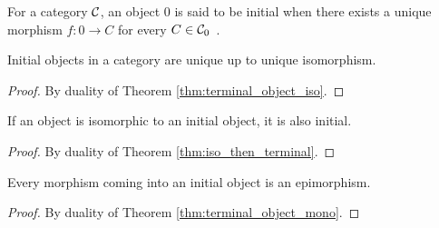 \begin{definition}
  For a category $\mathcal{C}$, an object $0$ is said to be initial when there exists a
  unique morphism $f: 0\to C$ for every $C\in
  \mathcal{C}_0$~\parencite[p.~48]{leinster:basic_category_theory}.
\end{definition}

\begin{theorem}
  Initial objects in a category are unique up to unique isomorphism.

  \begin{proof}
    By duality of Theorem \ref{thm:terminal_object_iso}.
  \end{proof}
\end{theorem}

\begin{theorem}\label{thm:iso_initial_object}
  If an object is isomorphic to an initial object, it is also initial.

  \begin{proof}
    By duality of Theorem \ref{thm:iso_then_terminal}.
  \end{proof}
\end{theorem}

\begin{theorem}
  Every morphism coming into an initial object is an epimorphism.

  \begin{proof}
    By duality of Theorem \ref{thm:terminal_object_mono}.
  \end{proof}
\end{theorem}